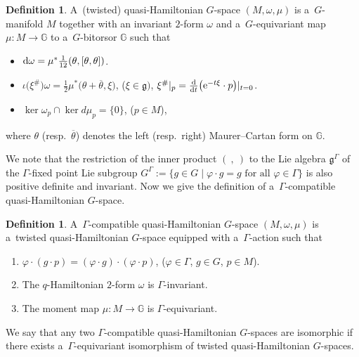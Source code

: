 \documentclass[10pt,a4paper]{amsart}
\numberwithin{equation}{section}
\theoremstyle{definition}
\newtheorem{Definition}[Theorem]{Definition}
\newcommand{\bG}{\mathbb{G}}
\begin{document}
\begin{Definition} A~(twisted) quasi-Hamiltonian $G$-space $(M, \omega, \mu)$ is a~$G$-manifold $M$ together with an invariant $2$-form $\omega$ and a~$G$-equivariant map $\mu \colon M \to \bG$ to a~$G$-bitorsor $\bG$ such that
\begin{itemize}\itemsep=0pt\setlength{\leftskip}{0.30cm}
 \item[(QH1)] ${\rm d}\omega = \mu^* \frac{1}{12}(\theta,[\theta,\theta])$.
 \item[(QH2)] $\iota \bigl(\xi ^{\#}\bigr)\omega = \frac{1}{2} \mu^* \bigl(\theta + \overline{\theta},\xi\bigr) $, ($\xi \in \mathfrak{g})$, $\xi^{\#}|_p = \frac{\rm d}{{\rm d} t}\bigl({\rm e}^{-t\xi}\cdot p\bigr)|_{t=0}$.
 \item[(QH3)] $\ker \omega_p \cap \ker d\mu_p =\{0\}$, ($p \in M$),
 \end{itemize}
where $\theta$ (resp.\ $\overline{\theta}$) denotes the left (resp.\ right) Maurer--Cartan form on $\bG$.
\end{Definition}

We note that the restriction of the inner product $(\ ,\ )$ to the Lie algebra $\mathfrak{g}^{\Gamma}$ of the $\Gamma$-fixed point Lie subgroup $G^{\Gamma} := \{g \in G\mid \varphi \cdot g = g \text{ for all } \varphi \in \Gamma\}$ is also positive definite and invariant.
Now we give the definition of a~$\Gamma$-compatible quasi-Hamiltonian $G$-space.

\begin{Definition}\label{def_compati_q-Ham}
 A~$\Gamma$-compatible quasi-Hamiltonian $G$-space $(M, \omega, \mu)$ is a~twisted quasi-Hamil\-tonian $G$-space equipped with a~$\Gamma$-action such that
\begin{enumerate}\itemsep=0pt
 \item[$(1)$] $\varphi \cdot (g \cdot p) = (\varphi \cdot g) \cdot (\varphi \cdot p)$, ($\varphi \in \Gamma$, $g \in G$, $ p \in M$).
 \item[$(2)$] The $q$-Hamiltonian $2$-form $\omega$ is $\Gamma$-invariant.
 \item[$(3)$] The moment map $\mu \colon M \to \bG$ is $\Gamma$-equivariant.
 \end{enumerate}
We say that any two $\Gamma$-compatible quasi-Hamiltonian $G$-spaces are isomorphic if there exists a~$\Gamma$-equivariant isomorphism of twisted quasi-Hamiltonian $G$-spaces.
\end{Definition}
\end{document}
